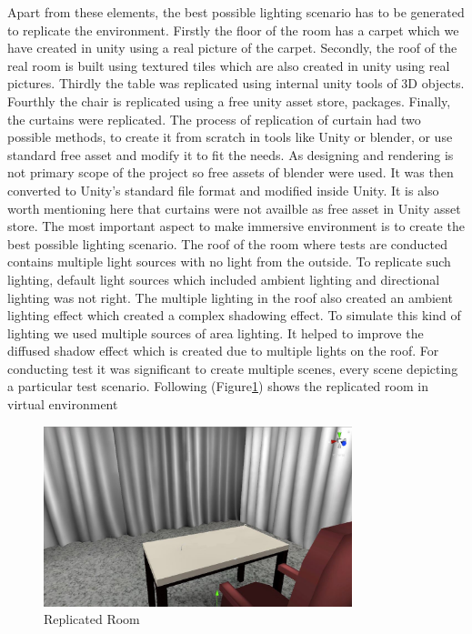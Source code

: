 Apart from these elements, the best possible lighting scenario has to be generated to replicate the environment. Firstly the floor of the room has a carpet which we have created in unity using a real picture of the carpet. Secondly, the roof of the real room is built using textured tiles which are also created in unity using real pictures. Thirdly the table was replicated using internal unity tools of 3D objects. Fourthly the chair is replicated using a free unity asset store, packages. Finally, the curtains were replicated. The process of replication of curtain had two possible methods, to create it from scratch in tools like Unity or blender, or use standard free asset and modify it to fit the needs. As designing and rendering is not primary scope of the project so free assets of blender were used. It was then converted to Unity's standard file format and modified inside Unity. It is also worth mentioning here that curtains were not availble as free asset in Unity asset store.   
The most important aspect to make immersive environment is to create the best possible lighting scenario. The roof of the room where tests are conducted contains multiple light sources with no light from the outside. To replicate such lighting, default light sources which included ambient lighting and directional lighting was not right. The multiple lighting in the roof also created an ambient lighting effect which created a complex shadowing effect. To simulate this kind of lighting we used multiple sources of area lighting. It helped to improve the diffused shadow effect which is created due to multiple lights on the roof. For conducting test it was significant to create multiple scenes, every scene depicting a particular test scenario. Following (Figure\ref{fig:replicated}) shows the replicated room in virtual environment\par
\begin{figure}[h]
    \centering
    \includegraphics[width=0.8\textwidth]{./images/replicated.jpg}
    \caption{Replicated Room}
    \label{fig:replicated}
\end{figure}

